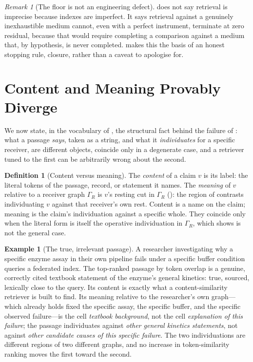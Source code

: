 \documentclass[11pt,twocolumn,a4paper]{article}
\theoremstyle{frathm}
\theoremstyle{definition}
\newtheorem{definition}[theorem]{Definition}
\newtheorem{example}[theorem]{Example}
\theoremstyle{remark}
\newtheorem{remark}[theorem]{Remark}
\newcommand{\Gph}{\Gamma}
\begin{document}
\begin{remark}[The floor is not an engineering defect]
\label{rem:floor-fact}
 does not say retrieval is imprecise because indexes are
imperfect. It says retrieval against a genuinely inexhaustible medium
cannot, even with a perfect instrument, terminate at zero residual,
because that would require completing a comparison against a medium that,
by hypothesis, is never completed.  makes this the
basis of an honest stopping rule, closure, rather than a caveat to
apologise for.
\end{remark}

\section{Content and Meaning Provably Diverge}
\label{sec:content-meaning}

We now state, in the vocabulary of , the structural fact
behind the failure of : what a passage \emph{says}, taken
as a string, and what it \emph{individuates} for a specific receiver, are
different objects, coincide only in a degenerate case, and a retriever
tuned to the first can be arbitrarily wrong about the second.

\begin{definition}[Content versus meaning]
\label{def:content-meaning}
The \emph{content} of a claim $v$ is its label: the literal tokens of the
passage, record, or statement it names. The \emph{meaning} of $v$
relative to a receiver graph $\Gph_R$ is $v$'s resting cut in $\Gph_R$
(): the region of contrasts individuating $v$ against
that receiver's own rest. Content is a name on the claim; meaning is the
claim's individuation against a specific whole. They coincide only when
the literal form is itself the operative individuation in $\Gph_R$, which
 shows is not the general case.
\end{definition}

\begin{example}[The true, irrelevant passage]
\label{ex:true-irrelevant}
A researcher investigating why a specific enzyme assay in their own
pipeline fails under a specific buffer condition queries a federated
index. The top-ranked passage by token overlap is a genuine, correctly
cited textbook statement of the enzyme's general kinetics: true, sourced,
lexically close to the query. Its content is exactly what a
content-similarity retriever is built to find. Its meaning relative to
the researcher's own graph---which already holds fixed the specific
assay, the specific buffer, and the specific observed failure---is the
cell \emph{textbook background}, not the cell \emph{explanation of this
failure}; the passage individuates against \emph{other general kinetics
statements}, not against \emph{other candidate causes of this specific
failure}. The two individuations are different regions of two different
graphs, and no increase in token-similarity ranking moves the first
toward the second.
\end{example}
\end{document}
